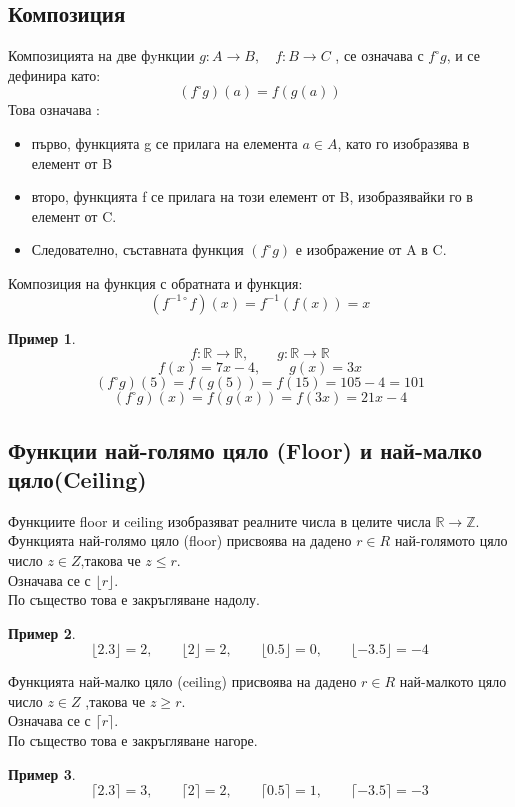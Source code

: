 \documentclass[fleqn, 12pt]{article}
\newtheorem{example}{Пример}[subsection]
\begin{document}
\subsection{Композиция}
Композицията на две фyнкции $g: A \rightarrow B, \quad f: B \rightarrow C$ , се означава с $f ^\circ g$, и се дефинира като: 
$$(f ^\circ g)(a) = f(g(a))$$
Това означава : 
\begin{itemize}
\item първо, функцията g се прилага на елемента $a \in A$, като го изобразява в елемент от B 
\item второ, функцията f се прилага на този елемент от B, изобразявайки го в елемент от C.
\item Следователно,  съставната функция $(f ^\circ g)$ е изображение от A в C.
\end{itemize}

Композиция на функция с обратната и функция:
$$(f^{-1\circ} f)(x) = f^{-1}(f(x)) = x$$

\begin{example}
$$f: \mathbb{R} \rightarrow \mathbb{R}, \qquad g: \mathbb{R} \rightarrow \mathbb{R} $$
$$f(x) = 7x - 4, \qquad g(x) = 3x$$
$$(f ^\circ g)(5) = f(g(5)) = f(15) = 105 - 4 = 101$$
$$(f ^\circ g)(x) = f(g(x)) = f(3x) = 21x - 4$$
\end{example}

\subsection{Функции най-голямо цяло (Floor) и най-малко цяло(Ceiling)}
Функциите floor и ceiling изобразяват реалните числа в целите числа $\mathbb{R} \rightarrow \mathbb{Z}$.\\
Функцията най-голямо цяло (floor) присвоява на дадено $r \in R$ най-голямото цяло число $z \in Z$,такова че $z \leq r$.\\
Означава се с $\lfloor r \rfloor$.\\
По същество това е закръгляване надолу.
\begin{example}
$$\lfloor 2.3 \rfloor = 2,\qquad \lfloor 2 \rfloor = 2,\qquad \lfloor 0.5 \rfloor = 0,\qquad \lfloor -3.5 \rfloor = -4$$
\end{example}
Функцията най-малко цяло (ceiling) присвоява на дадено $r \in R$ най-малкото цяло число $z \in Z$ ,такова че $z \geq r$. \\
Означава се с $\lceil r \rceil $.\\
По същество това е закръгляване нагоре.
\begin{example}
$$\lceil 2.3 \rceil = 3,\qquad  \lceil 2 \rceil = 2, \qquad \lceil 0.5 \rceil = 1,\qquad \lceil -3.5 \rceil = -3$$
\end{example}
\end{document}
